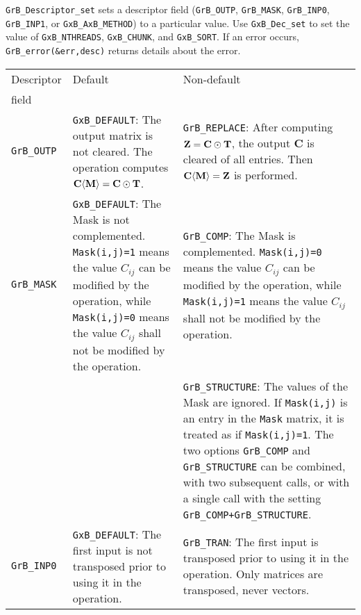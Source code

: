 \documentclass[12pt]{article}
\begin{document}
{\verb'GrB_Descriptor_set' sets a descriptor field (\verb'GrB_OUTP',
\verb'GrB_MASK', \verb'GrB_INP0', \verb'GrB_INP1', or \verb'GxB_AxB_METHOD') to
a particular value.  Use \verb'GxB_Dec_set' to set the value of
\verb'GxB_NTHREADS', \verb'GxB_CHUNK', and \verb'GxB_SORT'.
If an error occurs, \verb'GrB_error(&err,desc)' returns details about the error.

\vspace{0.2in}
\noindent
{\footnotesize
\begin{tabular}{|l|p{2.4in}|p{2.2in}|}
\hline
Descriptor & Default   & Non-default \\
field      & &  \\
\hline

\verb'GrB_OUTP'
    & \verb'GxB_DEFAULT':
    The output matrix is not cleared.  The operation computes
    ${\bf C \langle M \rangle = C \odot T}$.
    & \verb'GrB_REPLACE':
    After computing ${\bf Z=C\odot T}$,
    the output {\bf C} is cleared of all entries.
    Then ${\bf C \langle M \rangle = Z}$ is performed. \\

\hline

\verb'GrB_MASK'
    & \verb'GxB_DEFAULT':
    The Mask is not complemented.  \verb'Mask(i,j)=1' means the value $C_{ij}$
    can be modified by the operation, while \verb'Mask(i,j)=0' means the value
    $C_{ij}$ shall not be modified by the operation.
    & \verb'GrB_COMP':
    The Mask is complemented.  \verb'Mask(i,j)=0' means the value $C_{ij}$
    can be modified by the operation, while \verb'Mask(i,j)=1' means the value
    $C_{ij}$ shall not be modified by the operation. \\
    &
    & \verb'GrB_STRUCTURE':
    The values of the Mask are ignored.  If \verb'Mask(i,j)' is an entry
    in the \verb'Mask' matrix, it is treated as if \verb'Mask(i,j)=1'.
    The two options \verb'GrB_COMP' and \verb'GrB_STRUCTURE' can be
    combined, with two subsequent calls, or with a single call with the setting
    \verb'GrB_COMP+GrB_STRUCTURE'.  \\

\hline

\verb'GrB_INP0'
    & \verb'GxB_DEFAULT':
    The first input is not transposed prior to using it in the operation.
    & \verb'GrB_TRAN':
    The first input is transposed prior to using it in the operation.  Only
    matrices are transposed, never vectors. \\

\hline


\end{tabular}}}
\end{document}

